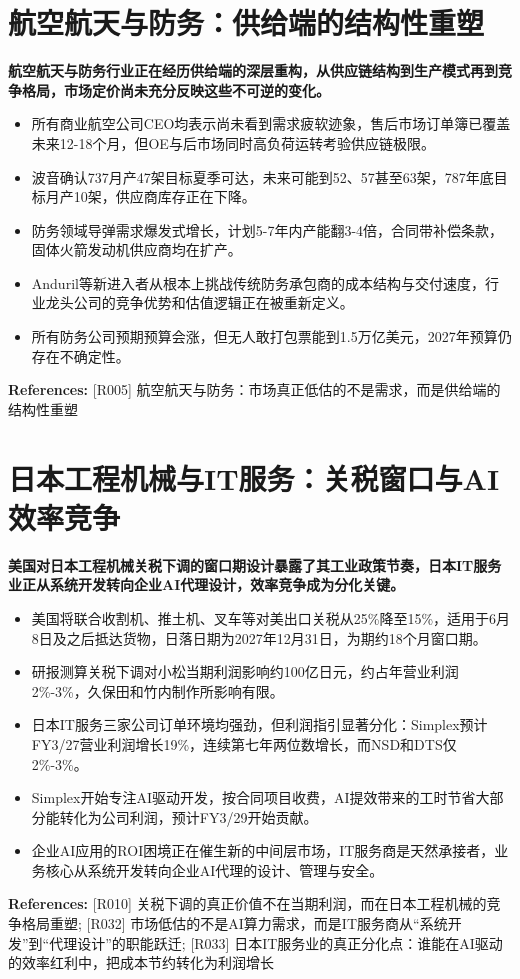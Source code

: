 \documentclass[11pt]{ctexart}
\begin{document}
\section{航空航天与防务：供给端的结构性重塑}
\textbf{航空航天与防务行业正在经历供给端的深层重构，从供应链结构到生产模式再到竞争格局，市场定价尚未充分反映这些不可逆的变化。}

\begin{itemize}
  \item 所有商业航空公司CEO均表示尚未看到需求疲软迹象，售后市场订单簿已覆盖未来12-18个月，但OE与后市场同时高负荷运转考验供应链极限。
  \item 波音确认737月产47架目标夏季可达，未来可能到52、57甚至63架，787年底目标月产10架，供应商库存正在下降。
  \item 防务领域导弹需求爆发式增长，计划5-7年内产能翻3-4倍，合同带补偿条款，固体火箭发动机供应商均在扩产。
  \item Anduril等新进入者从根本上挑战传统防务承包商的成本结构与交付速度，行业龙头公司的竞争优势和估值逻辑正在被重新定义。
  \item 所有防务公司预期预算会涨，但无人敢打包票能到1.5万亿美元，2027年预算仍存在不确定性。
\end{itemize}
{\small\color{refgray}\textbf{References:} [R005] 航空航天与防务：市场真正低估的不是需求，而是供给端的结构性重塑}

\section{日本工程机械与IT服务：关税窗口与AI效率竞争}
\textbf{美国对日本工程机械关税下调的窗口期设计暴露了其工业政策节奏，日本IT服务业正从系统开发转向企业AI代理设计，效率竞争成为分化关键。}

\begin{itemize}
  \item 美国将联合收割机、推土机、叉车等对美出口关税从25\%降至15\%，适用于6月8日及之后抵达货物，日落日期为2027年12月31日，为期约18个月窗口期。
  \item 研报测算关税下调对小松当期利润影响约100亿日元，约占年营业利润2\%-3\%，久保田和竹内制作所影响有限。
  \item 日本IT服务三家公司订单环境均强劲，但利润指引显著分化：Simplex预计FY3/27营业利润增长19\%，连续第七年两位数增长，而NSD和DTS仅2\%-3\%。
  \item Simplex开始专注AI驱动开发，按合同项目收费，AI提效带来的工时节省大部分能转化为公司利润，预计FY3/29开始贡献。
  \item 企业AI应用的ROI困境正在催生新的中间层市场，IT服务商是天然承接者，业务核心从系统开发转向企业AI代理的设计、管理与安全。
\end{itemize}
{\small\color{refgray}\textbf{References:} [R010] 关税下调的真正价值不在当期利润，而在日本工程机械的竞争格局重塑; [R032] 市场低估的不是AI算力需求，而是IT服务商从“系统开发”到“代理设计”的职能跃迁; [R033] 日本IT服务业的真正分化点：谁能在AI驱动的效率红利中，把成本节约转化为利润增长}
\end{document}
